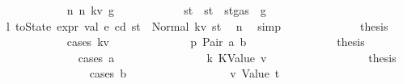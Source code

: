 \begin{isabellebody}
\ \ \ \ \ \ \ \ \ \ \isamarkupfalse%
\ n{}{\isacharcolon}{\kern0pt}\ {\isacharparenleft}{\kern0pt}n\ kv\ g{\isacharprime}{\kern0pt}{\isacharparenright}{\kern0pt}\isanewline
\ \ \ \ \ \ \ \ \ \ \isamarkupfalse%
\ st{\isacharprime}{\kern0pt}{\isacharprime}{\kern0pt}\ \ {\isachardoublequoteopen}st{\isacharprime}{\kern0pt}{\isacharprime}{\kern0pt}\ {\isacharequal}{\kern0pt}\ st{\isacharprime}{\kern0pt}{\isasymlparr}gas\ {\isacharcolon}{\kern0pt}{\isacharequal}{\kern0pt}\ g{\isacharprime}{\kern0pt}{\isasymrparr}{\isachardoublequoteclose}\isanewline
\ \ \ \ \ \ \ \ \ \ \isamarkupfalse%
\ \isamarkupfalse%
\ l{}{\isacharcolon}{\kern0pt}\ {\isachardoublequoteopen}toState\ {\isacharparenleft}{\kern0pt}expr\ val\ e\ cd{\isacharparenright}{\kern0pt}\ st{\isacharprime}{\kern0pt}\ {\isacharequal}{\kern0pt}\ Normal\ {\isacharparenleft}{\kern0pt}kv{\isacharcomma}{\kern0pt}\ st{\isacharprime}{\kern0pt}{\isacharprime}{\kern0pt}{\isacharparenright}{\kern0pt}{\isachardoublequoteclose}\ \isamarkupfalse%
\ n{}\ \isamarkupfalse%
\ simp\isanewline
\ \ \ \ \ \ \ \ \ \ \isamarkupfalse%
\ \isamarkupfalse%
\ {\isacharquery}{\kern0pt}thesis\isanewline
\ \ \ \ \ \ \ \ \ \ \isamarkupfalse%
\ {\isacharparenleft}{\kern0pt}cases\ kv{\isacharparenright}{\kern0pt}\isanewline
\ \ \ \ \ \ \ \ \ \ \ \ \isamarkupfalse%
\ p{}{\isacharcolon}{\kern0pt}\ {\isacharparenleft}{\kern0pt}Pair\ a\ b{\isacharparenright}{\kern0pt}\isanewline
\ \ \ \ \ \ \ \ \ \ \ \ \isamarkupfalse%
\ \isamarkupfalse%
\ {\isacharquery}{\kern0pt}thesis\isanewline
\ \ \ \ \ \ \ \ \ \ \ \ \isamarkupfalse%
\ {\isacharparenleft}{\kern0pt}cases\ a{\isacharparenright}{\kern0pt}\isanewline
\ \ \ \ \ \ \ \ \ \ \ \ \ \ \isamarkupfalse%
\ k{}{\isacharcolon}{\kern0pt}\ {\isacharparenleft}{\kern0pt}KValue\ v{\isacharparenright}{\kern0pt}\isanewline
\ \ \ \ \ \ \ \ \ \ \ \ \ \ \isamarkupfalse%
\ \isamarkupfalse%
\ {\isacharquery}{\kern0pt}thesis\isanewline
\ \ \ \ \ \ \ \ \ \ \ \ \ \ \isamarkupfalse%
\ {\isacharparenleft}{\kern0pt}cases\ b{\isacharparenright}{\kern0pt}\isanewline
\ \ \ \ \ \ \ \ \ \ \ \ \ \ \ \ \isamarkupfalse%
\ v{}{\isacharcolon}{\kern0pt}\ {\isacharparenleft}{\kern0pt}Value\ t{\isacharparenright}{\kern0pt}\isanewline
\ \ \ \ \ \ \ \ \ \ \ \ \ \ \ \ \isamarkupfalse%

\end{isabellebody}
